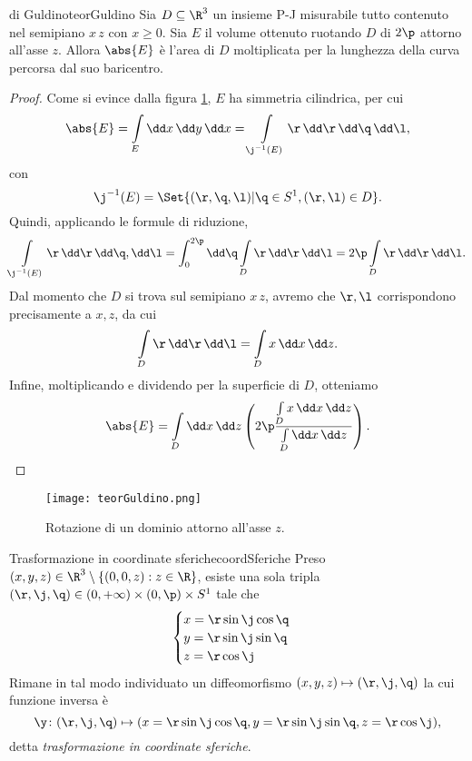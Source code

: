 \begin{teor}{di Guldino}{teorGuldino}
	Sia \(D\subseteq\R^3\) un insieme P-J misurabile tutto contenuto nel semipiano \(x\,z\) con \(x\ge 0\).
	Sia \(E\) il volume ottenuto ruotando \(D\) di \(2\p\) attorno all'asse \(z\).
	Allora \(\abs{E}\) è l'area di \(D\) moltiplicata per la lunghezza della curva percorsa dal suo baricentro.
\end{teor}

\begin{proof}
	Come si evince dalla figura \ref{fig:teorGuldino}, \(E\) ha simmetria cilindrica, per cui
	\[
		\abs{E} = \int\limits_E \dd x\,\dd y\,\dd x = \int\limits_{\j^{-1}(E)} \r\,\dd \r\,\dd \q\,\dd \l,
	\]
	con
	\[
		\j^{-1}(E) = \Set{(\r,\q,\l) | \q\in S^1, (\r,\l) \in D}.
	\]
	Quindi, applicando le formule di riduzione,
	\[
		\int\limits_{\j^{-1}(E)} \r\,\dd \r\,\dd \q,\dd \l = \int_0^{2\p}\dd \q \int\limits_D \r\,\dd \r\,\dd \l = 2\p \int\limits_D \r\,\dd \r\,\dd \l.
	\]
	Dal momento che \(D\) si trova sul semipiano \(x\,z\), avremo che \(\r,\l\) corrispondono precisamente a \(x,z\), da cui
	\[
		\int\limits_D \r\,\dd \r\,\dd \l = \int\limits_D x\,\dd x\,\dd z.
	\]
	Infine, moltiplicando e dividendo per la superficie di \(D\), otteniamo
	\[
		\abs{E} = \int\limits_D \dd x\,\dd z \left(2\p \frac{\int\limits_D x\,\dd x\,\dd z}{\int\limits_D \dd x\,\dd z}\right).\qedhere
	\]
\end{proof}

\begin{figure}[tp]
	\begin{centering}
		\texttt{[image: teorGuldino.png]}
		\caption{Rotazione di un dominio attorno all'asse \(z\).}
		\label{fig:teorGuldino}
	\end{centering}
\end{figure}

\begin{defn}{Trasformazione in coordinate sferiche}{coordSferiche}
	Preso \((x,y,z)\in\R^3\setminus\{(0,0,z):z\in\R\}\), esiste una sola tripla \((\r,\j,\q)\in (0,+\infty)\times (0,\p)\times S^1\) tale che
	\[
		\begin{cases}
			x = \r \sin \j \cos \q \\
			y = \r \sin \j \sin \q \\
			z = \r \cos \j
		\end{cases}
	\]
	Rimane in tal modo individuato un diffeomorfismo \((x,y,z)\mapsto(\r,\j,\q)\) la cui funzione inversa è
	\[
		\y\colon(\r,\j,\q)\mapsto (x=\r\sin\j \cos\q,y=\r\sin\j \sin\q,z=\r\cos\j),
	\]
	detta \emph{trasformazione in coordinate sferiche}.
\end{defn}

